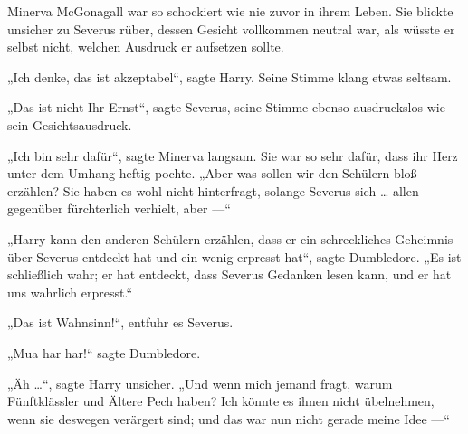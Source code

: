 Minerva McGonagall war so schockiert wie nie zuvor in ihrem Leben. Sie blickte unsicher zu Severus rüber, dessen Gesicht vollkommen neutral war, als wüsste er selbst nicht, welchen Ausdruck er aufsetzen sollte.

„Ich denke, das ist akzeptabel“, sagte Harry. Seine Stimme klang etwas seltsam.

„Das ist nicht Ihr Ernst“, sagte Severus, seine Stimme ebenso ausdruckslos wie sein Gesichtsausdruck.

„Ich bin sehr dafür“, sagte Minerva langsam. Sie war so sehr dafür, dass ihr Herz unter dem Umhang heftig pochte.
„Aber was sollen wir den Schülern bloß erzählen? Sie haben es wohl nicht hinterfragt, solange Severus sich … allen gegenüber fürchterlich verhielt, aber —“

„Harry kann den anderen Schülern erzählen, dass er ein schreckliches Geheimnis über Severus entdeckt hat und ein wenig erpresst hat“, sagte Dumbledore.
„Es ist schließlich wahr; er hat entdeckt, dass Severus Gedanken lesen kann, und er hat uns wahrlich erpresst.“

„Das ist Wahnsinn!“, entfuhr es Severus.

„Mua har har!“ sagte Dumbledore.

„Äh …“, sagte Harry unsicher.
„Und wenn mich jemand fragt, warum Fünftklässler und Ältere Pech haben? Ich könnte es ihnen nicht übelnehmen, wenn sie deswegen verärgert sind; und das war nun nicht gerade meine Idee —“

